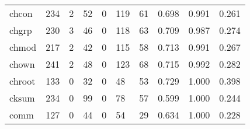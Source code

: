 \begin{longtable}{lp{1.3cm}p{1.3cm}p{1.3cm}p{1.3cm}p{1.3cm}p{1.3cm}p{1.3cm}p{1.3cm}p{1.3cm}}
chcon     &                    234 &                                  2 &                                52 &                                0 &                               119 &                              61 &                                0.698 &                                  0.991 &                                0.261 \\
chgrp     &                    230 &                                  3 &                                46 &                                0 &                               118 &                              63 &                                0.709 &                                  0.987 &                                0.274 \\
chmod     &                    217 &                                  2 &                                42 &                                0 &                               115 &                              58 &                                0.713 &                                  0.991 &                                0.267 \\
chown     &                    241 &                                  2 &                                48 &                                0 &                               123 &                              68 &                                0.715 &                                  0.992 &                                0.282 \\
chroot    &                    133 &                                  0 &                                32 &                                0 &                                48 &                              53 &                                0.729 &                                  1.000 &                                0.398 \\
cksum     &                    234 &                                  0 &                                99 &                                0 &                                78 &                              57 &                                0.599 &                                  1.000 &                                0.244 \\
comm      &                    127 &                                  0 &                                44 &                                0 &                                54 &                              29 &                                0.634 &                                  1.000 &                                0.228 \\

\end{longtable}
